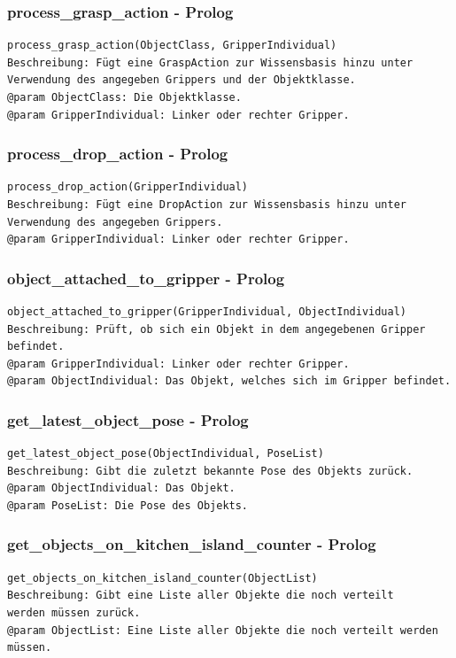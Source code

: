 \documentclass{suturo}
\begin{document}
\subsubsection{process\_grasp\_action - Prolog}
\begin{verbatim}
process_grasp_action(ObjectClass, GripperIndividual)
Beschreibung: Fügt eine GraspAction zur Wissensbasis hinzu unter 
Verwendung des angegeben Grippers und der Objektklasse.
@param ObjectClass: Die Objektklasse.
@param GripperIndividual: Linker oder rechter Gripper.
\end{verbatim}

\subsubsection{process\_drop\_action - Prolog}
\begin{verbatim}
process_drop_action(GripperIndividual)
Beschreibung: Fügt eine DropAction zur Wissensbasis hinzu unter 
Verwendung des angegeben Grippers.
@param GripperIndividual: Linker oder rechter Gripper.
\end{verbatim}

\subsubsection{object\_attached\_to\_gripper - Prolog}
\begin{verbatim}
object_attached_to_gripper(GripperIndividual, ObjectIndividual)
Beschreibung: Prüft, ob sich ein Objekt in dem angegebenen Gripper befindet.
@param GripperIndividual: Linker oder rechter Gripper.
@param ObjectIndividual: Das Objekt, welches sich im Gripper befindet.
\end{verbatim}

\subsubsection{get\_latest\_object\_pose - Prolog}
\begin{verbatim}
get_latest_object_pose(ObjectIndividual, PoseList)
Beschreibung: Gibt die zuletzt bekannte Pose des Objekts zurück.
@param ObjectIndividual: Das Objekt.
@param PoseList: Die Pose des Objekts.
\end{verbatim}

\subsubsection{get\_objects\_on\_kitchen\_island\_counter - Prolog}
\begin{verbatim}
get_objects_on_kitchen_island_counter(ObjectList)
Beschreibung: Gibt eine Liste aller Objekte die noch verteilt
werden müssen zurück.
@param ObjectList: Eine Liste aller Objekte die noch verteilt werden müssen.
\end{verbatim}
\end{document}
